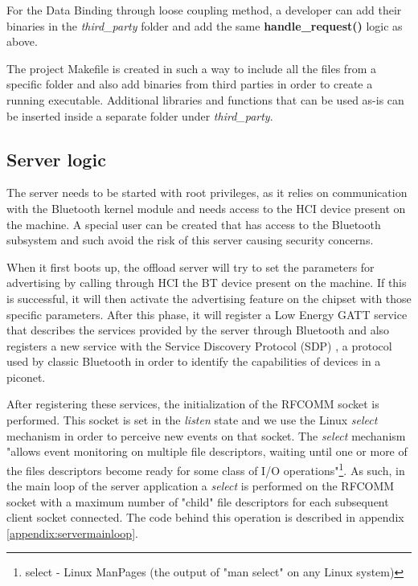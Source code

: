 For the Data Binding through loose coupling method, a developer can add their binaries in the \textit{third_party} folder and add the same \textbf{handle_request()} logic as above.

The project Makefile is created in such a way to include all the files from a specific folder and also add binaries from third parties in order to create a running executable. Additional libraries and functions that can be used as-is can be inserted inside a separate folder under \textit{third_party}.


\subsection{Server logic}
\label{subsection:serverlogic}

The server needs to be started with root privileges, as it relies on communication with the Bluetooth kernel module and needs access to the HCI device present on the machine. A special user can be created that has access to the Bluetooth subsystem and such avoid the risk of this server causing security concerns.

When it first boots up, the offload server will try to set the parameters for advertising by calling through HCI the BT device present on the machine. If this is successful, it will then activate the advertising feature on the chipset with those specific parameters. After this phase, it will register a Low Energy GATT service that describes the services provided by the server through Bluetooth and also registers a new service with the Service Discovery Protocol (SDP) , a protocol used by classic Bluetooth in order to identify the capabilities of devices in a piconet.

After registering these services, the initialization of the RFCOMM socket is performed. This socket is set in the \textit{listen} state and we use the Linux \textit{select}\cite{ostrowski2000mechanism} mechanism in order to perceive new events on that socket. The \textit{select} mechanism "allows event monitoring on multiple file descriptors, waiting until one or more of the files descriptors become ready for some class of I/O operations"\footnote{select - Linux ManPages (the output of "man select" on any Linux system)}. As such, in the main loop of the server application a \textit{select} is performed on the RFCOMM socket with a maximum number of "child" file descriptors for each subsequent client socket connected. The code behind this operation is described in appendix \ref{appendix:servermainloop}.

